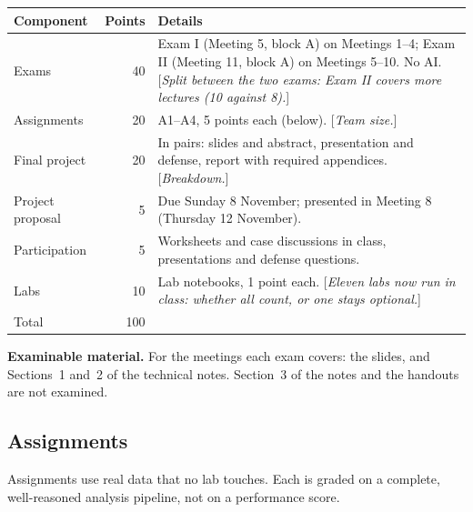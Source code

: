 \documentclass[11pt]{article}
\newcommand{\tbd}[1]{\textcolor{warnred}{[\emph{#1}]}}
\begin{document}
\begin{center}
\small
\begin{tabular}{lrL{8.6cm}}
\toprule
\textbf{Component} & \textbf{Points} & \textbf{Details} \\
\midrule
Exams & 40 & Exam I (Meeting 5, block A) on Meetings 1--4; Exam II (Meeting 11, block A) on Meetings 5--10. No AI. \tbd{Split between the two exams: Exam II covers more lectures (10 against 8).} \\
Assignments & 20 & A1--A4, 5 points each (below). \tbd{Team size.} \\
Final project & 20 & In pairs: slides and abstract, presentation and defense, report with required appendices. \tbd{Breakdown.} \\
Project proposal & 5 & Due Sunday 8 November; presented in Meeting 8 (Thursday 12 November). \\
Participation & 5 & Worksheets and case discussions in class, presentations and defense questions. \\
Labs & 10 & Lab notebooks, 1 point each. \tbd{Eleven labs now run in class: whether all count, or one stays optional.} \\
\midrule
Total & 100 & \\
\bottomrule
\end{tabular}
\end{center}

\textbf{Examinable material.} For the meetings each exam covers: the slides, and Sections~1 and~2
of the technical notes. Section~3 of the notes and the handouts are not examined.

\subsection*{Assignments}

Assignments use real data that no lab touches. Each is graded on a complete, well-reasoned analysis pipeline, not on
a performance score.
\end{document}
